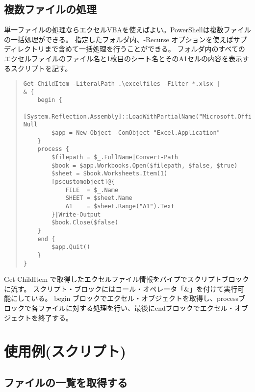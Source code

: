 \documentclass[dvipdfmx]{jsarticle}
\begin{document}
\subsection{複数ファイルの処理}
単一ファイルの処理ならエクセルVBAを使えばよい。PowerShellは複数ファイルの一括処理ができる。
指定したフォルダ内、-Recurse オプションを使えばサブディレクトリまで含めて一括処理を行うことができる。
フォルダ内のすべてのエクセルファイルのファイル名と1枚目のシート名とそのA1セルの内容を表示するスクリプトを記す。
\vspace{\baselineskip}
\begin{quote}
\begin{verbatim}
Get-ChildItem -LiteralPath .\excelfiles -Filter *.xlsx |
& {
    begin {
        [System.Reflection.Assembly]::LoadWithPartialName("Microsoft.Office.Interop.Excel")|Out-Null
        $app = New-Object -ComObject "Excel.Application"
    }
    process {
        $filepath = $_.FullName|Convert-Path
        $book = $app.Workbooks.Open($filepath, $false, $true)
        $sheet = $book.Worksheets.Item(1)
        [pscustomobject]@{
            FILE  = $_.Name
            SHEET = $sheet.Name
            A1    = $sheet.Range("A1").Text
        }|Write-Output
        $book.Close($false)
    }
    end {
        $app.Quit()
    }
}
\end{verbatim}
\end{quote}

Get-ChildItem で取得したエクセルファイル情報をパイプでスクリプトブロックに流す。
スクリプト・ブロックにはコール・オペレータ「\&」を付けて実行可能にしている。
begin ブロックでエクセル・オブジェクトを取得し、processブロックで各ファイルに対する処理を行い、最後にendブロックでエクセル・オブジェクトを終了する。








\section{使用例(スクリプト)}

\subsection{ファイルの一覧を取得する}
\end{document}
